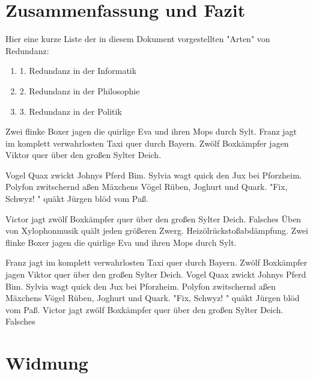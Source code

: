 \documentclass[a4paper,11pt]{article}
\begin{document}
\section{Zusammenfassung und Fazit}

Hier eine kurze Liste der in diesem Dokument vorgestellten
"Arten" von Redundanz:
\begin{enumerate}[label={}]
\item 1. Redundanz in der Informatik
\item 2. Redundanz in der Philosophie
\item 3. Redundanz in der Politik
\end{enumerate}

Zwei flinke Boxer jagen die quirlige Eva und ihren Mops durch Sylt.
Franz jagt im komplett verwahrlosten Taxi quer durch Bayern.
Zwölf Boxkämpfer jagen Viktor quer über den großen Sylter Deich.

Vogel Quax zwickt Johnys Pferd Bim. Sylvia wagt quick den Jux bei Pforzheim.
Polyfon zwitschernd aßen Mäxchens Vögel Rüben, Joghurt und
Quark. "Fix, Schwyz! " quäkt Jürgen blöd vom Paß.

Victor jagt zwölf Boxkämpfer quer über den großen Sylter Deich.
Falsches Üben von Xylophonmusik quält jeden größeren Zwerg.
Heizölrückstoßabdämpfung. Zwei flinke Boxer jagen die quirlige
Eva und ihren Mops durch Sylt.

Franz jagt im komplett verwahrlosten Taxi quer durch Bayern.
Zwölf Boxkämpfer jagen Viktor quer über den großen Sylter Deich.
Vogel Quax zwickt Johnys Pferd Bim. Sylvia wagt quick den Jux bei
Pforzheim. Polyfon zwitschernd aßen Mäxchens Vögel Rüben, Joghurt und
Quark. "Fix, Schwyz! " quäkt Jürgen blöd vom Paß.
Victor jagt zwölf Boxkämpfer quer über den großen Sylter Deich. Falsches 

\section{Widmung}
\end{document}
